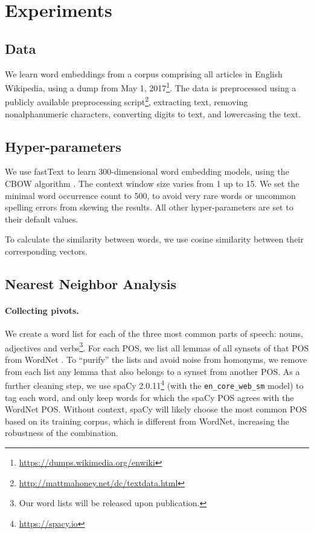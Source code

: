 \documentclass[11pt,a4paper]{article}
\begin{document}
    
    \section{Experiments}\label{sec:exp}
    
    \subsection{Data}\label{sec:data}
    We learn word embeddings from a corpus comprising all articles in English Wikipedia,
    using a dump from May 1, 2017\footnote{\url{https://dumps.wikimedia.org/enwiki}}.
    The data is preprocessed using a publicly available preprocessing
    script\footnote{\url{http://mattmahoney.net/dc/textdata.html}},
    extracting text, removing nonalphanumeric characters,
    converting digits to text, and lowercasing the text.
    
    \subsection{Hyper-parameters}\label{sec:hyperparams}
    We use fastText \cite{bojanowski2016enriching} to learn
    300-dimensional word embedding models,
    using the CBOW algorithm \cite{mikolov2013efficient}.
    The context window size varies from 1 up to 15.
    We set the minimal word occurrence count to 500, to avoid
    very rare words or uncommon spelling errors from skewing the results.
    All other hyper-parameters are set to their default values.
    
    To calculate the similarity between words, we use cosine similarity
    between their corresponding vectors.
    
    \subsection{Nearest Neighbor Analysis}\label{sec:nn_exp}
    	
    \paragraph{Collecting pivots.}
    
    We create a word list for each of the three most
    common parts of speech:
    nouns, adjectives and verbs\footnote{Our word lists will be released upon publication.}.
    For each POS, we list all lemmas of all synsets of that POS from
    WordNet \cite{miller1998wordnet}.
    To ``purify'' the lists and avoid noise from homonyms,
    we remove from each list any lemma that also belongs to a synset from
    another POS.
    As a further cleaning step, we use
    spaCy 2.0.11\footnote{\url{https://spacy.io}} (with the \texttt{en\_core\_web\_sm} model)
    to tag each word,
    and only keep words for which the spaCy POS agrees with the WordNet POS.
    Without context, spaCy will likely choose the most
    common POS based on its training corpus, which is different from WordNet,
    increasing the robustness of the combination.
    
\end{document}
